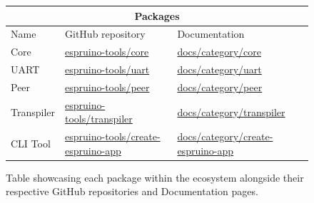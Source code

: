 \documentclass{l4proj}
\begin{document}
\begin{figure}[!ht]
    
\begin{center}
\begin{tabular}{|p{2.25cm}|p{5.25cm}|p{5.25cm}|}
 \hline
 \multicolumn{3}{|c|}{Packages} \\
 \hline
 Name  & GitHub repository& Documentation\\
 \hline
Core & \href{https://github.com/espruino-tools/core}{espruino-tools/core}  & \href{https://documentation-xi-liard.vercel.app/docs/category/core}{docs/category/core}  \\

UART & \href{https://github.com/espruino-tools/uart}{espruino-tools/uart}  & \href{https://documentation-xi-liard.vercel.app/docs/category/uart}{docs/category/uart}  \\

Peer & \href{https://github.com/espruino-tools/peer}{espruino-tools/peer}  & \href{https://documentation-xi-liard.vercel.app/docs/category/peer}{docs/category/peer}  \\

Transpiler & \href{https://github.com/espruino-tools/transpiler}{espruino-tools/transpiler}  & \href{https://documentation-xi-liard.vercel.app/docs/category/transpiler}{docs/category/transpiler}  \\

CLI Tool &  \href{https://github.com/espruino-tools/create-espruino-app}{espruino-tools/create-espruino-app}  & \href{https://documentation-xi-liard.vercel.app/docs/category/create-espruino-app}{docs/category/create-espruino-app}  \\
 \hline
\end{tabular}
\end{center} 
    \caption{Table showcasing each package within the ecosystem alongside their respective GitHub repositories and Documentation pages.}
    \label{fig:packages}
\end{figure}
\end{document}
